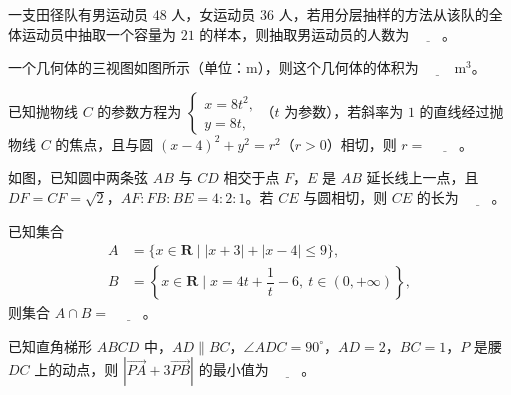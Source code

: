 \begin{question}
一支田径队有男运动员 $48$ 人，女运动员 $36$ 人，若用分层抽样的方法从该队的全体运动员中抽取一个容量为 $21$ 的样本，则抽取男运动员的人数为 $\underline{\qquad}$。

\Needspace{0.4\textheight}
\end{question}
\begin{question}
一个几何体的三视图如图所示（单位：$\mathrm{m}$），则这个几何体的体积为 $\underline{\qquad}\ \mathrm{m}^3$。
\nopagebreak[4]
\begin{center}\end{center}
\nopagebreak[4]
\end{question}
\begin{question}
已知抛物线 $C$ 的参数方程为 $\begin{cases}x=8t^2,\\ y=8t,\end{cases}$（$t$ 为参数），若斜率为 $1$ 的直线经过抛物线 $C$ 的焦点，且与圆 $(x-4)^2+y^2=r^2$（$r>0$）相切，则 $r=$ $\underline{\qquad}$。

\Needspace{0.4\textheight}
\end{question}
\begin{question}
如图，已知圆中两条弦 $AB$ 与 $CD$ 相交于点 $F$，$E$ 是 $AB$ 延长线上一点，且 $DF=CF=\sqrt2$，$AF:FB:BE=4:2:1$。若 $CE$ 与圆相切，则 $CE$ 的长为 $\underline{\qquad}$。
\nopagebreak[4]
\begin{center}\end{center}
\nopagebreak[4]
\end{question}
\begin{question}
已知集合
\nopagebreak[4]
\[
\begin{aligned}
A&=\{x\in\mathbf{R}\mid|x+3|+|x-4|\leqslant9\},\\
B&=\left\{x\in\mathbf{R}\mid x=4t+\dfrac1t-6,\ t\in(0,+\infty)\right\},
\end{aligned}
\]
则集合 $A\cap B=$ $\underline{\qquad}$。

\end{question}
\begin{question}
已知直角梯形 $ABCD$ 中，$AD\parallel BC$，$\angle ADC=90^\circ$，$AD=2$，$BC=1$，$P$ 是腰 $DC$ 上的动点，则 $\left|\overrightarrow{PA}+3\overrightarrow{PB}\right|$ 的最小值为 $\underline{\qquad}$。

\end{question}

